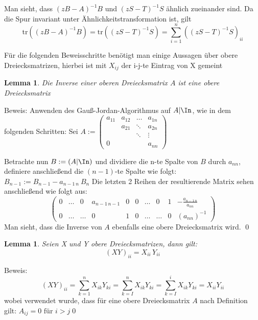 \documentclass[a4paper,12pt]{report}
\newcommand{\tr}{\text{tr}}
\newcommand{\inv}{^{-1}}
\newcommand{\1}{\mathds{1}}
\theoremstyle{plain} %
\newtheorem{lemma}[theorem]{Lemma}  %
\theoremstyle{definition} %
\theoremstyle{remark}
\begin{document}
            Man sieht, dass $(zB-A)\inv B$ und  $(zS-T)\inv S$ ähnlich zueinander sind.
            Da die Spur invariant unter Ähnlichkeitstransformation ist, gilt
            \begin{equation}
                  \label{eqn: Haltepunkt Bew Futamura}
                  \tr((zB-A)\inv B) = \tr((zS-T)\inv S) = \sum_{i=1}^{n}((zS-T)\inv S)_{ii}
            \end{equation}

            Für die folgenden Beweisschritte benötigt man einige Aussagen über obere Dreiecksmatrizen, hierbei ist mit $X_{ij}$ der i-j-te Eintrag von X gemeint

            \begin{lemma}
                  \label{Hilfslemma_Futamura: Inv Dreieck}
                  Die Inverse einer oberen Dreiecksmatrix $A$ ist eine obere Dreiecksmatrix
            \end{lemma}
            Beweis:
            Anwenden des Gauß-Jordan-Algorithmus auf $A|\In$, wie in dem folgenden Schritten:
            Sei $A:= \begin{pmatrix}
                  a_{11} & a_{12} & \dots & a_{1n}\\
                  & a_{21} &\ddots&a_{2n}\\
                   &  & \ddots &\vdots\\
                  0 &  & &a_{nn}
            \end{pmatrix}$

            Betrachte nun $B:=(A\vert \In)$ und dividiere die n-te Spalte von $B$ durch $a_{nn}$, definiere anschließend die $(n-1)$-te Spalte wie folgt:
            $B_{n-1}:=B_{n-1}-a_{n-1\, n}\ B_{n}$
            Die letzten 2 Reihen der resultierende Matrix sehen anschließend wie folgt aus:
            $$\left(\begin{array}{ccccc|cccccc}
                  0 & \dots & 0 & a_{n-1\, n-1}& 0&0&\dots&0&1&-\frac{a_{n-1\, n}}{a_{nn}}\\
                  0 & \dots & \dots & 0&1&0&\dots&\dots&0&(a_{nn})^{-1}
                \end{array}\right)$$
            Man sieht, dass die Inverse von $A$ ebenfalls eine obere Dreiecksmatrix wird. \qed

            \begin{lemma}
                  \label{Hilfslemma_Futamura: Prod Dreieck}
                  Seien X und Y obere Dreiecksmatrizen, dann gilt:
                  $$(XY)_{ii} = X_{ii}\, Y_{ii}$$
            \end{lemma}
            Beweis:
            $$(XY)_{ii} = \sum_{k=1}^n X_{ik}Y_{ki} = \sum_{k=I}^{n}X_{ik}Y_{ki} = \sum_{k=I}^{i}X_{ik}Y_{ki} = X_{ii} Y_{ii}$$
            wobei verwendet wurde, dass für eine obere Dreiecksmatrix $A$ nach Definition gilt:
            $A_{ij} = 0 \text{ für }i>j$\qed
\end{document}
